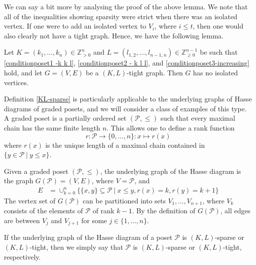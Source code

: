 \documentclass{article}
\begin{document}
We can say a bit more by analysing the proof of the above lemma. We note that all of the inequalities showing sparsity were strict when there was an isolated vertex. If one were to add an isolated vertex to $V_i$, where $i\leq t$, then one would also clearly not have a tight graph.  Hence, we have the following lemma. 

\begin{lemma}\label{no_isolated}
    Let $K=(k_1, \dots, k_n) \in \mathbb{Z}_{>0}^{n}$ and $L=(l_{1,2}, \dots, l_{n-1,n}) \in  \mathbb{Z}_{\geq 0}^{n-1}$ be such that \eqref{conditionposet1 -k k l}, \eqref{conditionposet2 - k l l}, and \eqref{conditionposet3-increasing} hold, and let $G=(V,E)$ be a $(K,L)$-tight graph. Then $G$ has no isolated vertices.
\end{lemma}

Definition \ref{KL-sparse} is particularly applicable to the underlying graphs of Hasse diagrams of graded posets, and we will consider a class of examples of this type. A graded poset is a partially ordered set $(\mathcal{P}, \leq)$ such that every maximal chain has the same finite length $n$. This allows one to define a rank function
\begin{equation*}
    r: \mathcal{P} \rightarrow \{0, \dots, n\}: x\mapsto r(x)
\end{equation*}
where $r(x)$ is the unique length of a maximal chain contained in $\{y\in \mathcal{P} ~ \vert ~ y\leq x\}$. 

Given a graded poset $(\mathcal{P}, \leq)$, the underlying graph of the Hasse diagram is the graph $G(\mathcal{P})=(V, E)$, where $V=\mathcal{P}$, and
\begin{align*}
    E&=\cup_{k=0}^{n}\{ \{x,y\} \subseteq \mathcal{P} ~|~ x\leq y, r(x)=k, r(y)=k+1 \}
\end{align*}
The vertex set of $G(\mathcal{P})$ can be partitioned into sets $V_1, \dots, V_{n+1}$, where $V_k$ consists of the elements of $\mathcal{P}$ of rank $k-1$.
By the definition of $G(\mathcal{P})$, all edges are between $V_j$ and $V_{j+1}$ for some $j\in \{1,\dots, n\}$.

If the underlying graph of the Hasse diagram of a poset $\mathcal{P}$ is $(K,L)$-sparse or $(K,L)$-tight, then we simply say that $\mathcal{P}$ is $(K,L)$-sparse or $(K,L)$-tight, respectively.
\end{document}
